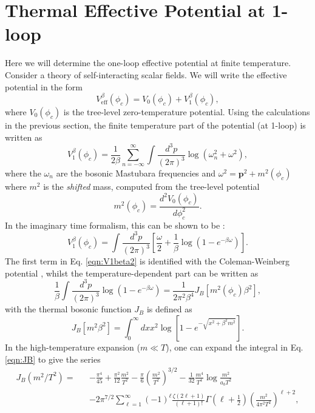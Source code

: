 \section{Thermal Effective Potential at 1-loop}
\label{sec:thermaleffpot}

Here we will determine the one-loop effective potential at finite temperature. Consider a theory of self-interacting scalar fields. We will write the effective potential in the form
\begin{equation}
V^{\beta}_{\text{eff}} (\phi_c) = V_0 (\phi_c) + V^{\beta}_1 (\phi_c),
\end{equation}
where $V_0 (\phi_c)$ is the tree-level zero-temperature potential. Using the calculations in the previous section, the finite temperature part of the potential (at 1-loop) is written as
\begin{equation}
V^{\beta}_1 (\phi_c)=\frac{1}{2\beta}\sum^{\infty}_{n=-\infty} \int \frac{d^3p}{(2 \pi)^3} \log (\omega^2_n + \omega^2),
\label{eqn:V1beta}
\end{equation}
where the $\omega_n$ are the bosonic Mastubara frequencies and $\omega^2 = \textbf{p}^2 + m^2 (\phi_c)$ where $m^2$ is the \textit{shifted} mass, computed from the tree-level potential
\begin{equation}
m^2 (\phi_c) = \frac{d^2 V_0 (\phi_c)}{d\phi^2_c}.
\end{equation}
In the imaginary time formalism, this can be shown to be \cite{RN729}:
\begin{equation}
V^{\beta}_1 (\phi_c)= \int \frac{d^3p}{(2 \pi)^3} \left[ \frac{\omega}{2}+\frac{1}{\beta} \log (1-e^{-\beta \omega})\right].
\label{eqn:V1beta2}
\end{equation}
The first term in Eq. \ref{eqn:V1beta2} is identified with the Coleman-Weinberg potential \cite{RN683}, whilst the temperature-dependent part can be written as
\begin{equation}
\frac{1}{\beta} \int \frac{d^3p}{(2 \pi)^3}  \log (1-e^{-\beta \omega}) = \frac{1}{2\pi^2\beta^4} J_B[m^2(\phi_c)\beta^2],
\end{equation}
with the thermal bosonic function $J_B$ is defined as
\begin{equation}
J_B[m^2\beta^2] = \int^{\infty}_0 dx x^2 \log \left[ 1-e^{-\sqrt{x^2+\beta^2 m^2}}\right].
\label{eqn:JB}
\end{equation}
In the high-temperature expansion ($m \ll T$), one can expand the integral in Eq. \ref{eqn:JB} to give the series
\begin{eqnarray}
J_B (m^2/T^2) = &&-\frac{\pi^4}{45} + \frac{\pi^2}{12}\frac{m^2}{T^2}-\frac{\pi}{6} \left( \frac{m^2}{T^2}\right)^{3/2} -\frac{1}{32}\frac{m^4}{T^4} \log \frac{m^2}{a_b T^2} \nonumber \\
&& -2\pi^{7/2} \sum^{\infty}_{\ell=1} (-1)^{\ell} \frac{\zeta(2\ell +1)}{(\ell+1)!} \Gamma \left(\ell+\frac{1}{2} \right) \left( \frac{m^2}{4\pi^2 T^2}\right)^{\ell+2},
\end{eqnarray}
